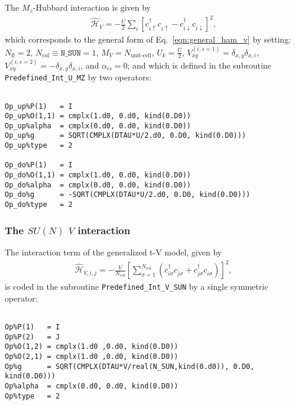 The $M_z$-Hubbard interaction is given by 
\begin{align}
\hat{\mathcal{H}}_{V} = - \frac{U}{2}\sum\limits_{i}\left[
c^{\dagger}_{i \uparrow} c^{\phantom\dagger}_{i \uparrow}  -   c^{\dagger}_{i \downarrow} c^{\phantom\dagger}_{i \downarrow}  \right]^{2},
\end{align} 
which corresponds to the general form of Eq.~\eqref{eqn:general_ham_v} by setting: 
$N_{\mathrm{fl}} = 2$, $N_{\mathrm{col}} \equiv \texttt{N\_SUN} =1 $,  $M_V =  N_{\text{unit-cell}} $,  $U_{k} = \frac{U}{2}$, 
$V_{x y}^{(i, s=1)} =  \delta_{x,y} \delta_{x,i}  $,  $V_{x y}^{(i, s=2)} =  - \delta_{x,y} \delta_{x,i}  $, and $\alpha_{is}   = 0  $; and which is defined in the subroutine \texttt{Predefined\_Int\_U\_MZ} by two operators:
\begin{lstlisting}[style=fortran]
        
Op_up%P(1)   = I
Op_up%O(1,1) = cmplx(1.d0, 0.d0, kind(0.D0))
Op_up%alpha  = cmplx(0.d0, 0.d0, kind(0.D0))
Op_up%g      = SQRT(CMPLX(DTAU*U/2.d0, 0.D0, kind(0.D0))) 
Op_up%type   = 2

Op_do%P(1)   = I
Op_do%O(1,1) = cmplx(1.d0, 0.d0, kind(0.D0))
Op_do%alpha  = cmplx(0.d0, 0.d0, kind(0.D0))
Op_do%g      = -SQRT(CMPLX(DTAU*U/2.d0, 0.D0, kind(0.D0))) 
Op_do%type   = 2

\end{lstlisting}


\subsubsection{The $SU(N)$ $V$ interaction}

The interaction term of the generalized t-V model, given by 
\begin{align}
\hat{\mathcal{H}}_{V,i,j} =
-\frac{V}{N_\mathrm{col}}\left[ \sum_{\sigma=1}^{N_\mathrm{col}}\left( c^{\dagger}_{i \sigma} c^{\phantom\dagger}_{j \sigma} + c^{\dagger}_{j \sigma} c^{\phantom\dagger}_{i \sigma} \right) \right]^2,
\end{align} 
is coded in the subroutine \texttt{Predefined\_Int\_V\_SUN} by a single symmetric operator:
\begin{lstlisting}[style=fortran]

Op%P(1)   = I
Op%P(2)   = J
Op%O(1,2) = cmplx(1.d0 ,0.d0, kind(0.D0)) 
Op%O(2,1) = cmplx(1.d0 ,0.d0, kind(0.D0))
Op%g      = SQRT(CMPLX(DTAU*V/real(N_SUN,kind(0.d0)), 0.D0, kind(0.D0))) 
Op%alpha  = cmplx(0.d0, 0.d0, kind(0.D0))
Op%type   = 2

\end{lstlisting}


